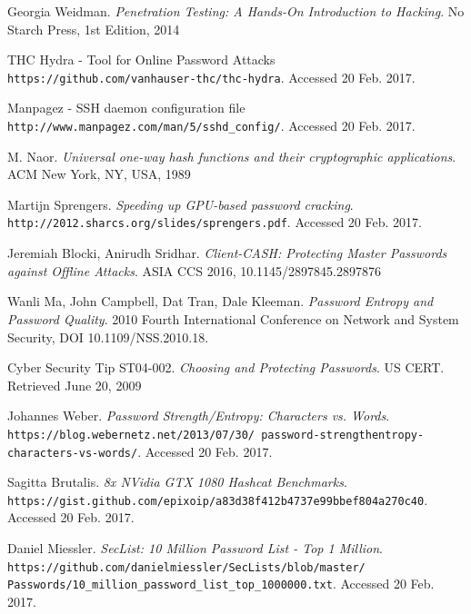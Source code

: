 \documentclass[11pt, a4paper]{article}
\begin{document}
\begin{thebibliography}{99}

Georgia Weidman.
\textit{Penetration Testing: A Hands-On Introduction to Hacking}.
No Starch Press, 1st Edition, 2014

THC Hydra - Tool for Online Password Attacks
\\\texttt{https://github.com/vanhauser-thc/thc-hydra}.
Accessed 20 Feb. 2017.

Manpagez - SSH daemon configuration file
\\\texttt{http://www.manpagez.com/man/5/sshd\_config/}.
Accessed 20 Feb. 2017.

M. Naor.
\textit{Universal one-way hash functions and their cryptographic applications}.
ACM New York, NY, USA,  1989

Martijn Sprengers.
\textit{Speeding up GPU-based password cracking}.
\\\texttt{http://2012.sharcs.org/slides/sprengers.pdf}.
Accessed 20 Feb. 2017.

Jeremiah Blocki, Anirudh Sridhar.
\textit{Client-CASH: Protecting Master Passwords against Offline Attacks}.
ASIA CCS 2016, 10.1145/2897845.2897876

Wanli Ma, John Campbell, Dat Tran, Dale Kleeman.
\textit{Password Entropy and Password Quality}.
2010 Fourth International Conference on Network and System Security, DOI 10.1109/NSS.2010.18.

Cyber Security Tip ST04-002.
\textit{Choosing and Protecting Passwords}.
US CERT. Retrieved June 20, 2009

Johannes Weber.
\textit{Password Strength/Entropy: Characters vs. Words}.
\\\texttt{https://blog.webernetz.net/2013/07/30/ password-strengthentropy-characters-vs-words/}.
Accessed 20 Feb. 2017.

Sagitta Brutalis.
\textit{8x NVidia GTX 1080 Hashcat Benchmarks}.
\\\texttt{https://gist.github.com/epixoip/a83d38f412b4737e99bbef804a270c40}.
Accessed 20 Feb. 2017.

Daniel Miessler.
\textit{SecList: 10 Million Password List - Top 1 Million}.
\\\texttt{https://github.com/danielmiessler/SecLists/blob/master/ Passwords/10\_million\_password\_list\_top\_1000000.txt}.
Accessed 20 Feb. 2017.


\end{thebibliography}
\end{document}
